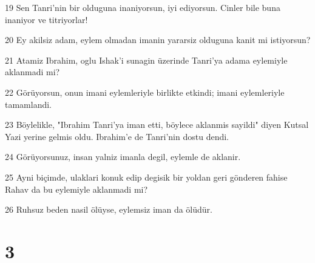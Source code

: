 \par 19 Sen Tanri'nin bir olduguna inaniyorsun, iyi ediyorsun. Cinler bile buna inaniyor ve titriyorlar!
\par 20 Ey akilsiz adam, eylem olmadan imanin yararsiz olduguna kanit mi istiyorsun?
\par 21 Atamiz Ibrahim, oglu Ishak'i sunagin üzerinde Tanri'ya adama eylemiyle aklanmadi mi?
\par 22 Görüyorsun, onun imani eylemleriyle birlikte etkindi; imani eylemleriyle tamamlandi.
\par 23 Böylelikle, "Ibrahim Tanri'ya iman etti, böylece aklanmis sayildi" diyen Kutsal Yazi yerine gelmis oldu. Ibrahim'e de Tanri'nin dostu dendi.
\par 24 Görüyorsunuz, insan yalniz imanla degil, eylemle de aklanir.
\par 25 Ayni biçimde, ulaklari konuk edip degisik bir yoldan geri gönderen fahise Rahav da bu eylemiyle aklanmadi mi?
\par 26 Ruhsuz beden nasil ölüyse, eylemsiz iman da ölüdür.

\chapter{3}

